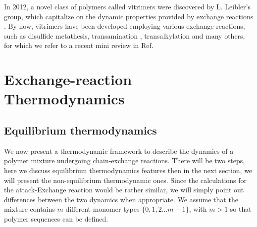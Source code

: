 \documentclass[
	amsmath,
	amssymb,
	a4paper,
	aip,		%
	jcp,		%
	reprint, twocolumn  %
	fleqn,
	showpacs,
	floatfix
]{revtex4-1}
\begin{document}
In 2012, a novel class of polymers called vitrimers were discovered by L. Leibler's group, which capitalize on the dynamic properties provided by exchange reactions \cite{Montarnal965,Capelot2012}. By now, vitrimers have been developed employing various exchange reactions, such as disulfide metathesis, transamination \cite{Denissen2015}, transalkylation and many others, for which we refer to a recent mini review in Ref\cite{Denissen2016}.

\section{Exchange-reaction Thermodynamics}
\label{sec:thermo}

\subsection{Equilibrium thermodynamics}
\label{subsec:eqtd}
We now present a thermodynamic framework to describe the dynamics of a polymer mixture undergoing chain-exchange reactions.
There will be two steps, here we discuss equilibrium thermodynamics features then in the next section, we will present 
the non-equilibrium thermodynamic ones. 
Since the calculations for the attack-Exchange reaction would be rather similar, we will simply point out 
differences between the two dynamics when appropriate. 
We assume that the mixture contains $m$ different monomer types $\{0,1,2... m-1 \}$,
with $m>1$ so that polymer sequences can be defined.
\end{document}
